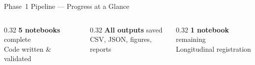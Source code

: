 \documentclass[aspectratio=169, dvipsnames]{beamer}
\begin{document}
\begin{frame}{Phase~1 Pipeline — Progress at a Glance}
\begin{center}
    \end{center}

    \vspace{0.5em}

    \begin{columns}
        \begin{column}{0.32\textwidth}
            \centering
            \scriptsize
            \textcolor{ForestGreen}{} \textbf{5 notebooks} complete\\
            Code written \& validated
        \end{column}
        \begin{column}{0.32\textwidth}
            \centering
            \scriptsize
            \textcolor{ForestGreen}{} \textbf{All outputs} saved\\
            CSV, JSON, figures, reports
        \end{column}
        \begin{column}{0.32\textwidth}
            \centering
            \scriptsize
            \textcolor{red}{} \textbf{1 notebook} remaining\\
            Longitudinal registration
        \end{column}
    \end{columns}
\end{frame}
\end{document}
